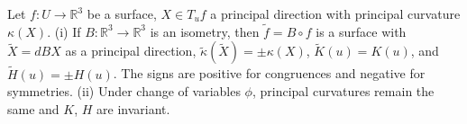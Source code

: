 Let $f: U \to \mathbb{R}^3$ be a surface, $X \in T_u f$ a principal direction with principal curvature $\kappa(X)$.
(i) If $B: \mathbb{R}^3 \to \mathbb{R}^3$ is an isometry, then $\tilde{f} = B \circ f$ is a surface with $\tilde{X} = dB X$ as a principal direction, $\tilde{\kappa}(\tilde{X}) = \pm \kappa(X)$, $\tilde{K}(u) = K(u)$, and $\tilde{H}(u) = \pm H(u)$. The signs are positive for congruences and negative for symmetries.
(ii) Under change of variables $\phi$, principal curvatures remain the same and $K$, $H$ are invariant.